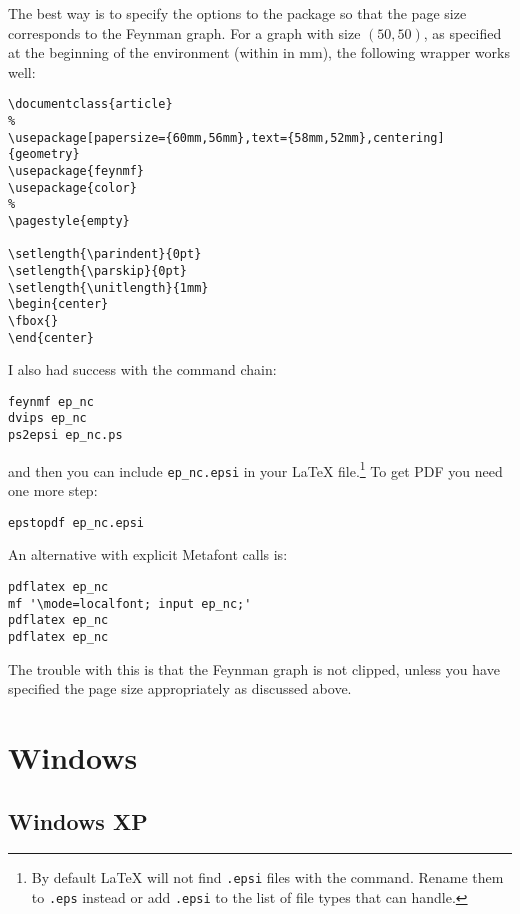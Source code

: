 The best way is to specify the options to the 
package so that the page size corresponds to the Feynman graph. For a
graph with size $(50,50)$, as specified at the beginning of the
 environment (within  in \si{\mm}), the
following wrapper works well:
\begin{verbatim}
\documentclass{article}
%
\usepackage[papersize={60mm,56mm},text={58mm,52mm},centering]{geometry}
\usepackage{feynmf}
\usepackage{color}
%
\pagestyle{empty}

\setlength{\parindent}{0pt}
\setlength{\parskip}{0pt}
\setlength{\unitlength}{1mm}
\begin{center}
\fbox{}
\end{center}

\end{verbatim}

I also had success with the command chain:
\begin{verbatim}
feynmf ep_nc
dvips ep_nc
ps2epsi ep_nc.ps
\end{verbatim}
and then you can include \texttt{ep\_nc.epsi} in your \LaTeX
file.\footnote{By default \LaTeX{} will not find \texttt{.epsi} files
  with the  command. Rename them to
  \texttt{.eps} instead or add \texttt{.epsi} to the list of file
  types that  can handle.} To
get PDF you need one more step:
\begin{verbatim}
epstopdf ep_nc.epsi
\end{verbatim}

An alternative with explicit Metafont calls is:
\begin{verbatim}
pdflatex ep_nc
mf '\mode=localfont; input ep_nc;'
pdflatex ep_nc
pdflatex ep_nc
\end{verbatim}
The trouble with this is that the Feynman graph is not clipped, unless
you have specified the page size appropriately as discussed above.


\section{Windows}
\label{sec:app:old:windows}

\subsection{Windows XP}


